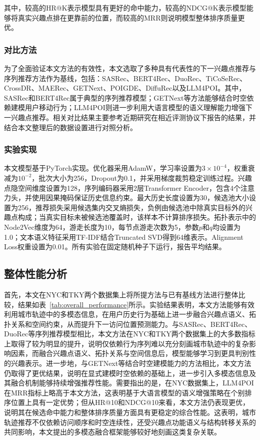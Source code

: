 \documentclass{rjthesis}
\begin{document}
其中，较高的HR@K表示模型具有更好的命中能力，较高的NDCG@K表示模型能够将真实兴趣点排在更靠前的位置，而较高的MRR则说明模型整体排序质量更优。


\subsubsection{对比方法}

为了全面验证本文方法的有效性，本文选取了多种具有代表性的下一兴趣点推荐与序列推荐方法作为基线，包括：SASRec\cite{kang2018sasrec}、BERT4Rec\cite{sun2019bert4rec}、DuoRec\cite{duoRec}、TiCoSeRec\cite{dang2023ticosec}、CrossDR\cite{crossdr}、MAERec\cite{maerec}、GETNext\cite{yang2022getnext}、POIGDE\cite{poigde}、DiffuRec\cite{diffuRec}以及LLM4POI\cite{llm4poi}。其中，SASRec和BERT4Rec属于典型的序列推荐模型；GETNext等方法能够结合时空依赖建模用户移动行为；LLM4POI则进一步利用大语言模型的语义理解能力增强下一兴趣点推荐。相关对比结果主要参考近期研究在相近评测协议下报告的结果，并结合本文整理后的数据设置进行对照分析。

\subsubsection{实验实现}

本文模型基于PyTorch实现。优化器采用AdamW，学习率设置为$3\times10^{-4}$，权重衰减为$10^{-2}$，批次大小为256，Dropout为0.1，并采用梯度裁剪稳定训练过程。兴趣点隐空间维度设置为128，序列编码器采用2层Transformer Encoder，包含4个注意力头，并使用因果掩码保证历史信息约束。最大历史长度设置为30，候选池大小设置为256，推荐损失采用候选集内交叉熵损失，负例由候选池中除真实目标外的兴趣点构成；当真实目标未被候选池覆盖时，该样本不计算排序损失。拓扑表示中的Node2Vec维度为64，游走长度为10，每节点游走次数为5，参数$p$和$q$均设置为1.0；文本语义特征采用TF-IDF结合Truncated SVD得到64维表示。Alignment Loss权重设置为0.01。所有实验在固定随机种子下运行，报告平均结果。

\subsection{整体性能分析}

首先，本文在NYC和TKY两个数据集上将所提方法与已有基线方法进行整体比较，结果如表~\ref{tab:overall_performance}所示。实验结果表明，本文方法能够有效利用城市轨迹中的多模态信息，在用户历史行为基础上进一步融合兴趣点语义、拓扑关系和空间约束，从而提升下一访问位置预测能力。与SASRec、BERT4Rec、DuoRec等序列推荐模型相比，本文方法在NYC和TKY两个数据集上的大多数指标上取得了较为明显的提升，说明仅依赖行为序列难以充分刻画城市轨迹中的复杂影响因素，而融合兴趣点语义、拓扑关系与空间信息后，模型能够学习到更具判别性的兴趣表示。进一步地，与GETNext等结合时空建模能力的方法相比，本文方法仍取得了更优结果，说明在显式建模时空依赖的基础上，进一步引入多模态信息及其融合机制能够持续增强推荐性能。需要指出的是，在NYC数据集上，LLM4POI在MRR指标上略高于本文方法，这表明基于大语言模型的语义增强策略在个别排序位置上具有一定优势；但从HR@10和NDCG@10来看，本文方法仍表现更优，说明其在候选命中能力和整体排序质量方面具有更稳定的综合性能。这表明，城市轨迹推荐不仅依赖访问顺序和时空连续性，还受兴趣点功能语义与结构转移关系的共同影响，本文提出的多模态融合框架能够较好地刻画这类复杂关联。
\end{document}
